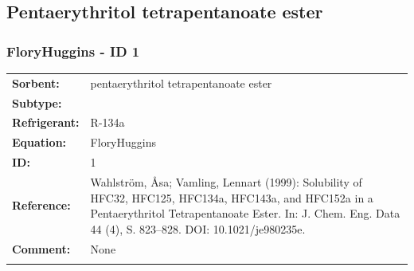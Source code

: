 \subsection{Pentaerythritol tetrapentanoate ester }
%
\subsubsection{FloryHuggins - ID 1}
%
\begin{tabular}[l]{|lp{11.5cm}|}
\hline
\addlinespace

\textbf{Sorbent:} & pentaerythritol tetrapentanoate ester \\
\textbf{Subtype:} &  \\
\textbf{Refrigerant:} & R-134a \\
\textbf{Equation:} & FloryHuggins \\
\textbf{ID:} & 1 \\
\textbf{Reference:} & Wahlström, Åsa; Vamling, Lennart (1999): Solubility of HFC32, HFC125, HFC134a, HFC143a, and HFC152a in a Pentaerythritol Tetrapentanoate Ester. In: J. Chem. Eng. Data 44 (4), S. 823–828. DOI: 10.1021/je980235e. \\
\textbf{Comment:} & None \\

\addlinespace
\hline
\end{tabular}
\newline

